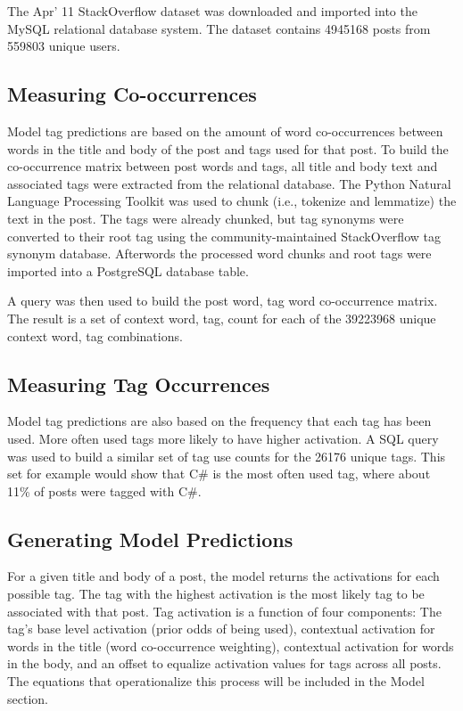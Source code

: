 \documentclass[10pt,letterpaper]{article}
\begin{document}
The Apr' 11 StackOverflow dataset \cite{DataDump2011} was downloaded and imported into the MySQL relational database system.
The dataset contains \num{4945168} posts from \num{559803} unique users.

\subsection{Measuring Co-occurrences}

Model tag predictions are based on the amount of word co-occurrences between words in the title and body of the post and tags used for that post.
To build the co-occurrence matrix between post words and tags, all title and body text and associated tags were extracted from the relational database.
The Python Natural Language Processing Toolkit \cite{Bird2009} was used to chunk (i.e., tokenize and lemmatize) the text in the post.
The tags were already chunked, but tag synonyms were converted to their root tag using the community-maintained StackOverflow tag synonym database.
Afterwords the processed word chunks and root tags were imported into a PostgreSQL database table.

A query was then used to build the post word, tag word co-occurrence matrix.
The result is a set of context word, tag, count for each of the \num{39223968} unique context word, tag combinations.

\subsection{Measuring Tag Occurrences}

Model tag predictions are also based on the frequency that each tag has been used.
More often used tags more likely to have higher activation.
A SQL query was used to build a similar set of tag use counts for the \num{26176} unique tags.
This set for example would show that C\# is the most often used tag, where about 11\% of posts were tagged with C\#.

\subsection{Generating Model Predictions}

For a given title and body of a post, the model returns the activations for each possible tag.
The tag with the highest activation is the most likely tag to be associated with that post.
Tag activation is a function of four components:
The tag's base level activation (prior odds of being used),
contextual activation for words in the title (word co-occurrence weighting),
contextual activation for words in the body,
and an offset to equalize activation values for tags across all posts.
The equations that operationalize this process will be included in the Model section.
\end{document}
